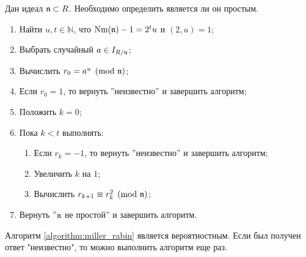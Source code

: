 \documentclass[_00_dissertation.tex]{subfiles}
\begin{document}
\begin{algorithm}\label{algorithm:miller_rabin}
    Дан идеал $\mathfrak{n} \subset R$.
    Необходимо определить является ли он простым.

    \begin{enumerate}
        \item Найти $u, t \in \mathbb{N}$, что $\textrm{Nm}(\mathfrak{n}) - 1 = 2^t u$ и $(2, u) = 1$;
        
        \item Выбрать случайный $a \in I_{R/\mathfrak{n}}$;

        \item Вычислить $r_0 = a^u \pmod{\mathfrak{n}}$;

        \item Если $r_0 = 1$, то вернуть ''неизвестно'' и завершить алгоритм;

        \item Положить $k = 0$;

        \item Пока $k < t$ выполнять:
        \begin{enumerate}
            \item Если $r_k = -1$, то вернуть ''неизвестно'' и завершить алгоритм;

            \item Увеличить $k$ на $1$;

            \item Вычислить $r_{k+1} \equiv r_k^2 \pmod{\mathfrak{n}}$;
        \end{enumerate}

        \item Вернуть ''$\mathfrak{n}$ не простой'' и завершить алгоритм.
    \end{enumerate}
\end{algorithm}

\begin{remark}
    Алгоритм \ref{algorithm:miller_rabin} является вероятностным.
    Если был получен ответ "неизвестно", то можно выполнить алгоритм еще раз.
\end{remark}
\end{document}
